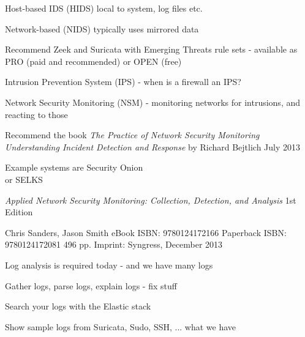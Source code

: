 \documentclass[Screen16to9,17pt]{foils}
\begin{document}


\begin{list1}
\item Host-based IDS (HIDS) local to system, log files etc.
\item Network-based (NIDS) typically uses mirrored data
\item Recommend Zeek  and Suricata  with Emerging Threats rule sets  - available as PRO (paid and recommended) or OPEN (free)
\item Intrusion Prevention System (IPS) - when is a firewall an IPS?
\end{list1}



\begin{list1}
\item Network Security Monitoring (NSM) - monitoring networks for intrusions, and reacting to those
\item Recommend the book \emph{The Practice of Network Security Monitoring
Understanding Incident Detection and Response}
by Richard Bejtlich
July 2013
\item Example systems are Security Onion \\
 or SELKS 
\end{list1}



\emph{Applied Network Security Monitoring: Collection, Detection, and Analysis}
1st Edition

Chris Sanders, Jason Smith
eBook ISBN: 9780124172166
Paperback ISBN: 9780124172081 496 pp.
Imprint: Syngress, December 2013

{\footnotesize{}}



\begin{list1}
\item Log analysis is required today - and we have many logs
\item Gather logs, parse logs, explain logs - fix stuff
\item Search your logs with the Elastic stack
\item Show sample logs from Suricata, Sudo, SSH, ... what we have
\end{list1}
\end{document}

